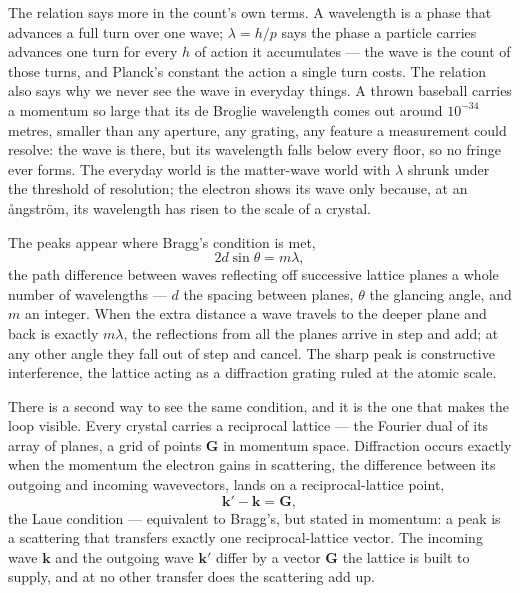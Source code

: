 The relation says more in the count's own terms. A wavelength is a phase that advances a full turn over
one wave; $\lambda = h/p$ says the phase a particle carries advances one turn for every $h$ of
action it accumulates --- the wave is the count of those turns, and Planck's constant the action a single turn
costs. The relation also says why we never see the wave in everyday things. A thrown baseball carries a
momentum so large that its de Broglie wavelength comes out around $10^{-34}$ metres, smaller than any aperture,
any grating, any feature a measurement could resolve: the wave is there, but its wavelength falls below every
floor, so no fringe ever forms. The everyday world is the matter-wave world with $\lambda$ shrunk under the
threshold of resolution; the electron shows its wave only because, at an \aa{}ngstr\"om, its wavelength has
risen to the scale of a crystal.

The peaks appear where Bragg's condition is met,
\begin{equation}
  2 d \sin\theta = m\lambda,
\end{equation}
the path difference between waves reflecting off successive lattice planes a whole number of wavelengths ---
$d$ the spacing between planes, $\theta$ the glancing angle, and $m$ an integer. When the extra distance a
wave travels to the deeper plane and back is exactly $m\lambda$, the reflections from all the planes arrive in
step and add; at any other angle they fall out of step and cancel. The sharp peak is constructive
interference, the lattice acting as a diffraction grating ruled at the atomic scale.

There is a second way to see the same condition, and it is the one that makes the loop visible. Every crystal
carries a reciprocal lattice --- the Fourier dual of its array of planes, a grid of points $\mathbf{G}$ in
momentum space. Diffraction occurs exactly when the momentum the electron gains in scattering, the difference
between its outgoing and incoming wavevectors, lands on a reciprocal-lattice point,
\begin{equation}
  \mathbf{k}' - \mathbf{k} = \mathbf{G},
\end{equation}
the Laue condition --- equivalent to Bragg's, but stated in momentum: a peak is a scattering that transfers
exactly one reciprocal-lattice vector. The incoming wave $\mathbf{k}$ and the outgoing wave $\mathbf{k}'$
differ by a vector $\mathbf{G}$ the lattice is built to supply, and at no other transfer does the scattering
add up.

